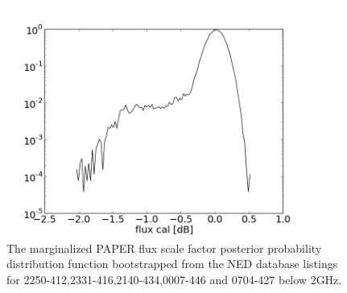 \documentclass[preprint]{aastex}
\begin{document}
\begin{figure}
\centering
\includegraphics[width=0.9\textwidth]{plots/2250-412_2331-416_2140-434_0007-446_0704-427_gain_mcmc_chain_gain_conf.png}
\caption{
The marginalized PAPER flux scale factor posterior probability distribution
function bootstrapped from the NED database listings for
2250-412,2331-416,2140-434,0007-446 and 0704-427 below 2GHz.
\label{fig:gain}}
\end{figure}
\end{document}
